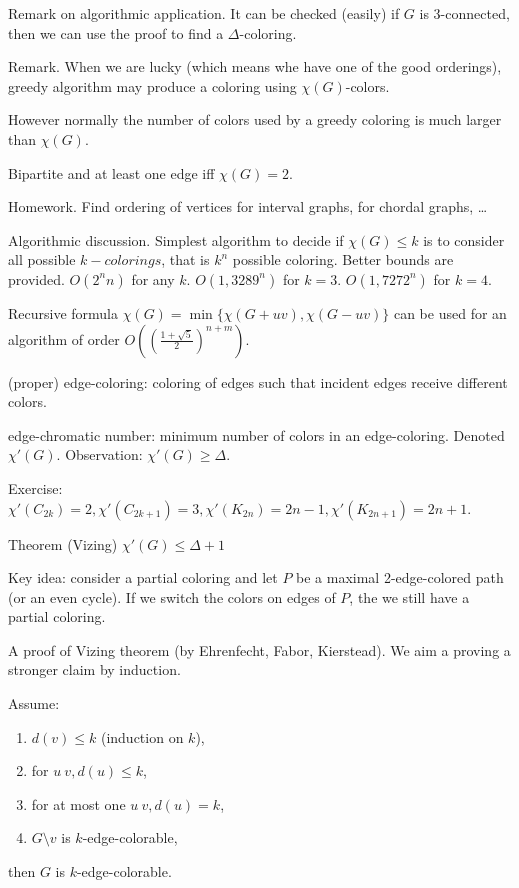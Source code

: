 \documentclass[12pt,a4paper]{article}
\begin{document}
Remark on algorithmic application. It can be checked (easily) if \(G\) is
3-connected, then we can use the proof to find a \(\Delta\)-coloring.

Remark. When we are lucky (which means whe have one of the good orderings),
greedy algorithm may produce a coloring using \(\chi(G)\)-colors.

However normally the number of colors used by a greedy coloring is much larger
than \(\chi(G)\).

Bipartite and at least one edge iff \(\chi(G)=2\).

Homework. Find ordering of vertices for interval graphs, for chordal graphs, …

Algorithmic discussion.  Simplest algorithm to decide if \(\chi(G) \leq k\) is
to consider all possible \(k-colorings\), that is \(k^n\) possible
coloring. Better bounds are provided. \(O(2^n n)\) for any
\(k\). \(O(1,3289^n)\) for \(k=3\). \(O(1,7272^n)\) for \(k=4\).

Recursive formula \(\chi(G)=\min\{\chi(G+uv), \chi(G-uv)\}\) can be used for an
algorithm of order \(O\left({\left(\frac{1+\sqrt{5}}{2}\right)}^{n+m}\right)\).

(proper) edge-coloring: coloring of edges such that incident edges receive
different colors.

edge-chromatic number: minimum number of colors in an edge-coloring. Denoted
\(\chi'(G)\). Observation: \(\chi'(G) \geq \Delta\).

Exercise:
\(\chi'(C_{2k})=2, \chi'(C_{2k+1})=3, \chi'(K_{2n})=2n-1, \chi'(K_{2n+1})=2n+1\).

Theorem (Vizing) \(\chi'(G) \leq \Delta + 1\)

Key idea: consider a partial coloring and let \(P\) be a maximal 2-edge-colored
path (or an even cycle). If we switch the colors on edges of \(P\), the we still
have a partial coloring.

A proof of Vizing theorem (by Ehrenfecht, Fabor, Kierstead).  We aim a proving a
stronger claim by induction.

Assume: \begin{enumerate}
\item \(d(v) \leq k\) (induction on \(k\)),
\item for \(u ~ v, d(u) \leq k\),
\item for at most one \(u ~ v, d(u) = k\),
\item \(G \setminus v\) is \(k\)-edge-colorable,
\end{enumerate} then \(G\) is \(k\)-edge-colorable.
\end{document}
